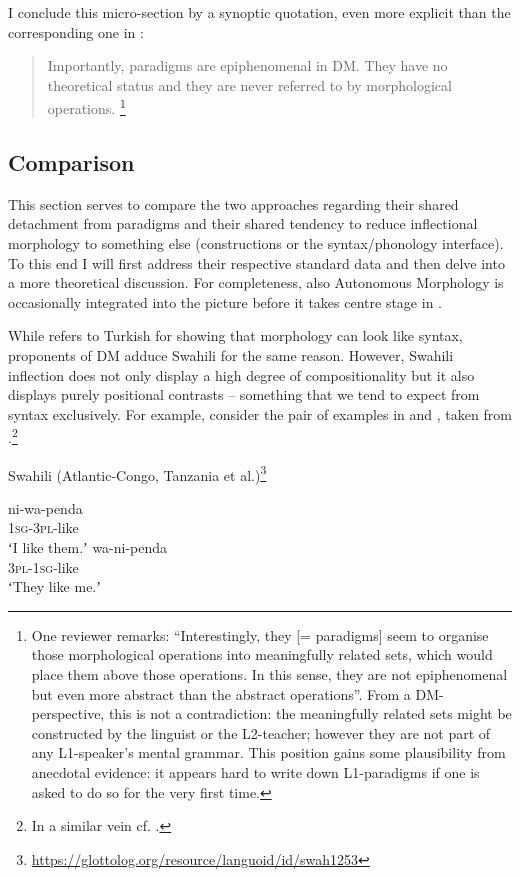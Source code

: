 \documentclass[output=paper]{langsci/langscibook}
\begin{document}
I conclude this micro-section by a synoptic quotation, even more explicit than the corresponding one in :

\begin{quote}
Importantly, paradigms are epiphenomenal in DM. They have no theoretical status and they are never referred to by morphological operations. \citep[97]{Kramer2016}\footnote{One reviewer remarks: “Interestingly, they [= paradigms] seem to organise those morphological operations into meaningfully related sets, which would place them above those operations. In this sense, they are not epiphenomenal but even more abstract than the abstract operations”. From a DM-perspective, this is not a contradiction: the meaningfully related sets might be constructed by the linguist or the L2-teacher; however they are not part of any L1-speaker’s mental grammar. This position gains some plausibility from anecdotal evidence: it appears hard to write down L1-paradigms if one is asked to do so for the very first time.}
\end{quote}

\subsection{Comparison} \label{reiner:2.3}\largerpage[1.5]

This section serves to compare the two approaches regarding their shared detachment from paradigms and their shared tendency to reduce inflectional morphology to something else (constructions or the syntax/phonology interface). To this end I will first address their respective standard data and then delve into a more theoretical discussion. For completeness, also Autonomous Morphology is occasionally integrated into the picture before it takes centre stage in .

While \citet[58--59]{Haspelmath2011} refers to Turkish for showing that morphology can look like syntax, proponents of DM adduce Swahili for the same reason. However, Swahili inflection does not only display a high degree of compositionality but it also displays purely positional contrasts – something that we tend to expect from syntax exclusively. For example, consider the pair of examples in  and , taken from \citet[18]{Trommer2001}.\footnote{In a similar vein cf. \citet{Crippen2019}.}

\ea \label{ex:reiner:19} 
Swahili (Atlantic-Congo, Tanzania et al.)\footnote{\url{https://glottolog.org/resource/languoid/id/swah1253}}
\begin{multicols}{2}\raggedcolumns
\ea
\gll \label{ex:reiner:19a}ni-wa-penda\\
     1\textsc{sg}{}-3\textsc{pl}{}-like\\
\glt ʻI like them.ʼ\columnbreak
\ex \label{ex:reiner:19b}
\gll wa-ni-penda\\
     3\textsc{pl}{}-1\textsc{sg}{}-like\\
\glt ʻThey like me.ʼ
\z
\end{multicols}
\z
\end{document}
